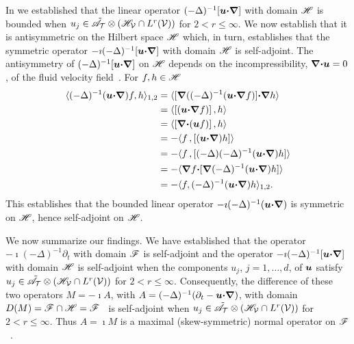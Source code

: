 \documentclass[amsa]{ipart}
\begin{document}
In  we established that the linear operator 
$(-\Delta)^{-1}[\boldsymbol{u}\mbox{\boldmath${\cdot}$}\mbox{\boldmath${\nabla}$}]$ with domain $\mathscr{H}$ is bounded when
$u_j\in\tilde{\mathscr{A}}_{\mathcal{T}}\otimes (\mathscr{H}_{\mathcal{V}}\cap L^r(\mathcal{V}))$ for $2<r\leq\infty$. We
now establish that it is antisymmetric on the Hilbert space $\mathscr{H}$
which, in turn, establishes that the symmetric operator
$-\imath(-\Delta)^{-1}[\boldsymbol{u}\mbox{\boldmath${\cdot}$}\mbox{\boldmath${\nabla}$}]$ with domain $\mathscr{H}$ is self-adjoint. The
antisymmetry of $(-\Delta)^{-1}[\boldsymbol{u}\mbox{\boldmath${\cdot}$}\mbox{\boldmath${\nabla}$}]$ on $\mathscr{H}$ 
depends on the incompressibility, $\mbox{\boldmath${\nabla}$}\mbox{\boldmath${\cdot}$}\boldsymbol{u}=0$, of the fluid
velocity field~\cite{Bhattacharya:AAP:1999:951}.  For $f,h\in\mathscr{H}$    
%
\begin{align}\label{eq:Anti-sym_Sobolev}
 \langle(-\Delta)^{-1}(\vecu\bcdot\bnabla)f,h\rangle_{1,2}
       &=\langle[\bnabla((-\Delta)^{-1}(\vecu\bcdot\bnabla f)]\bcdot\bnabla h\rangle
       \\                              
       &=\langle[(\vecu\bcdot\bnabla f)]\,,h\rangle
       \notag\\
       &=\langle[\bnabla\bcdot(\vecu f)]\,,h\rangle
       \notag\\     
       &=-\langle f\,,[(\vecu\bcdot\bnabla)h]\rangle
       \notag\\
       &=-\langle f\,,[(-\Delta)(-\Delta)^{-1}(\vecu\bcdot\bnabla)h]\rangle
       \notag\\
       &=-\langle\bnabla f\bcdot[\bnabla(-\Delta)^{-1}(\vecu\bcdot\bnabla)h]\rangle
       \notag\\                              
       &= -\langle f,(-\Delta)^{-1}(\vecu\bcdot\bnabla)h\rangle_{1,2}.
       \notag
\end{align}
%
%
This establishes that the bounded linear operator
$-\imath(-\Delta)^{-1}(\boldsymbol{u}\mbox{\boldmath${\cdot}$}\mbox{\boldmath${\nabla}$})$ is symmetric on $\mathscr{H}$, hence
self-adjoint on $\mathscr{H}$.


We now summarize our findings. We have established that the
operator $-\imath(-\Delta)^{-1}\partial_t$ with domain $\mathscr{F}$ is self-adjoint and the
operator $-\imath(-\Delta)^{-1}[\boldsymbol{u}\mbox{\boldmath${\cdot}$}\mbox{\boldmath${\nabla}$}]$ with domain $\mathscr{H}$ is
self-adjoint when the components $u_j$, $j=1,\ldots,d$, of $\boldsymbol{u}$ satisfy
$u_j\in\tilde{\mathscr{A}}_{\mathcal{T}}\otimes (\mathscr{H}_{\mathcal{V}}\cap L^r(\mathcal{V}))$ for
$2<r\leq\infty$. Consequently, the difference of these two operators $M=-\imath A$,
with $A=(-\Delta)^{-1}(\partial_t-\boldsymbol{u}\mbox{\boldmath${\cdot}$}\mbox{\boldmath${\nabla}$})$, with domain
$D(M)=\mathscr{F}\cap\mathscr{H}=\mathscr{F}$~\cite{Stone:64} is self-adjoint when
$u_j\in\tilde{\mathscr{A}}_{\mathcal{T}}\otimes(\mathscr{H}_{\mathcal{V}}\cap L^r(\mathcal{V}))$ for $2<r\leq\infty$. Thus
$A=\imath M$ is a maximal (skew-symmetric) normal operator on
$\mathscr{F}$~\cite{Stone:64}.      
\end{document}
